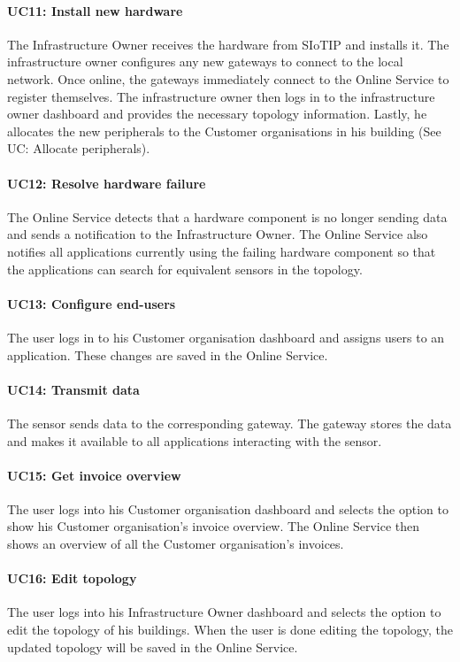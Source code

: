 \documentclass[english]{sareport}
\begin{document}
\paragraph{UC11: Install new hardware}
The Infrastructure Owner receives the hardware from SIoTIP and installs it. The infrastructure owner configures any new gateways to connect to the local network. Once online, the gateways immediately connect to the Online Service to register themselves. The infrastructure owner then logs in to the infrastructure owner dashboard and provides the necessary topology information. Lastly, he allocates the new peripherals to the Customer organisations in his building (See UC: Allocate peripherals).

\paragraph{UC12: Resolve hardware failure}
The Online Service detects that a hardware component is no longer sending data and sends a notification to the Infrastructure Owner. The Online Service also notifies all applications currently using the failing hardware component so that the applications can search for equivalent sensors in the topology. 

\paragraph{UC13: Configure end-users}
The user logs in to his Customer organisation dashboard and assigns users to an application. These changes are saved in the Online Service.

\paragraph{UC14: Transmit data}
The sensor sends data to the corresponding gateway. The gateway stores the data and makes it available to all applications interacting with the sensor.

\paragraph{UC15: Get invoice overview}
The user logs into his Customer organisation dashboard and selects the option to show his Customer organisation's invoice overview. The Online Service then shows an overview of all the Customer organisation's invoices.

\paragraph{UC16: Edit topology}
The user logs into his Infrastructure Owner dashboard and selects the option to edit the topology of his buildings. When the user is done editing the topology, the updated topology will be saved in the Online Service.
\end{document}
